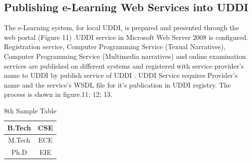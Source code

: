 \subsection{Publishing e-Learning Web Services into UDDI}
The e-Learning system, for local UDDI, is prepared and presented through the web portal (Figure 11) .UDDI service in Microsoft Web Server 2008 is configured.  Registration service, Computer 
Programming Service (Texual Narratives), Computer Programming Service (Multimedia narratives) and online examination services are published on different
systems and registered with service provider's name to UDDI by publish service of UDDI \cite{support, uddi, service}. UDDI Service 
requires Provider's name and the service’s WSDL file for it’s publication in UDDI registry. The process is shown in figure.11; 12; 13.

\begin{table}
 \begin{center}
 \caption{8th Sample Table}
 \begin{tabular}{|c|c|}
 \hline
 B.Tech & CSE\\
 \hline
 M.Tech & ECE\\
 \hline
 Ph.D & EIE\\
 \hline 
 \end{tabular}
 \end{center}
\end{table}

